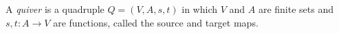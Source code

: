 \begin{definition}\label{Arden24-def-1.1}
\label{Arden24-def:quiver}
A \emph{quiver} is a quadruple $Q = (V, A, s, t)$ in which $V$ and $A$ are finite sets and $s, t \colon A \to V$ are functions, called the source and target maps.
\end{definition}